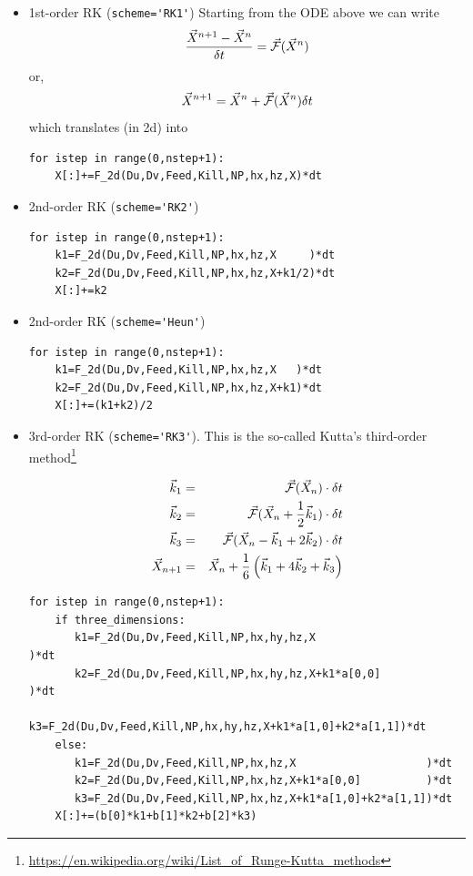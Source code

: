\begin{itemize}

\item 1st-order RK (\lstinline{scheme='RK1'})
Starting from the ODE above we can write
\[
\frac{\vec{X}^{n+1} -\vec{X}^{n} }{\delta t} = \vec{\cal F} (\vec{X}^n)
\]
or, 
\[
\vec{X}^{n+1}
=
\vec{X}^{n} + \vec{\cal F} (\vec{X}^n) \delta t
\]
which translates (in 2d) into
\begin{lstlisting}
for istep in range(0,nstep+1):
    X[:]+=F_2d(Du,Dv,Feed,Kill,NP,hx,hz,X)*dt
\end{lstlisting}

\item 2nd-order RK (\lstinline{scheme='RK2'})
\begin{lstlisting}
for istep in range(0,nstep+1):
    k1=F_2d(Du,Dv,Feed,Kill,NP,hx,hz,X     )*dt
    k2=F_2d(Du,Dv,Feed,Kill,NP,hx,hz,X+k1/2)*dt
    X[:]+=k2
\end{lstlisting}

\item 2nd-order RK (\lstinline{scheme='Heun'})

\begin{lstlisting}
for istep in range(0,nstep+1):
    k1=F_2d(Du,Dv,Feed,Kill,NP,hx,hz,X   )*dt
    k2=F_2d(Du,Dv,Feed,Kill,NP,hx,hz,X+k1)*dt
    X[:]+=(k1+k2)/2
\end{lstlisting}

\item 3rd-order RK (\lstinline{scheme='RK3'}).
This is the so-called Kutta's third-order 
method\footnote{\url{https://en.wikipedia.org/wiki/List_of_Runge-Kutta_methods}}

\begin{eqnarray}
\vec{k}_1 &=& \vec{\cal F}(\vec{X}_n) \cdot \delta t\nonumber\\
\vec{k}_2 &=& \vec{\cal F}(\vec{X}_n+ \frac{1}{2} \vec{k}_1) \cdot \delta t \nonumber\\
\vec{k}_3 &=& \vec{\cal F}(\vec{X}_n -\vec{k}_1 +2\vec{k}_2) \cdot \delta t \nonumber\\
\vec{X}_{n+1} &=& \vec{X}_n + \frac{1}{6}\left(\vec{k}_1 + 4\vec{k}_2 + \vec{k}_3 \right)
\end{eqnarray}

\begin{lstlisting}
for istep in range(0,nstep+1):
    if three_dimensions:
       k1=F_2d(Du,Dv,Feed,Kill,NP,hx,hy,hz,X                    )*dt 
       k2=F_2d(Du,Dv,Feed,Kill,NP,hx,hy,hz,X+k1*a[0,0]          )*dt
       k3=F_2d(Du,Dv,Feed,Kill,NP,hx,hy,hz,X+k1*a[1,0]+k2*a[1,1])*dt
    else:
       k1=F_2d(Du,Dv,Feed,Kill,NP,hx,hz,X                    )*dt 
       k2=F_2d(Du,Dv,Feed,Kill,NP,hx,hz,X+k1*a[0,0]          )*dt
       k3=F_2d(Du,Dv,Feed,Kill,NP,hx,hz,X+k1*a[1,0]+k2*a[1,1])*dt
    X[:]+=(b[0]*k1+b[1]*k2+b[2]*k3)
\end{lstlisting}



\end{itemize}
